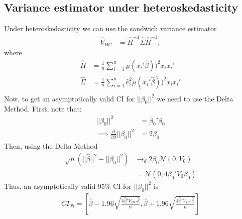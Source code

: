 \documentclass[12pt]{article}
\newcommand{\mtx}[1]{\ensuremath{\bm{\mathit{#1}}}}
\newcommand{\N}{\mathcal{N}}
\begin{document}
\subsection{Variance estimator under heteroskedasticity}
Under heteroskedasticity we can use the sandwich variance estimator
\begin{align*}
\widehat{\mtx{V}}_{HC} &= \hat{H}^{-1}\hat \Sigma \hat{H}^{-1},
\end{align*}
where
\begin{align*}
\hat{H} &= \frac{1}{n} \sum_{i=1}^n \dot{\mu}(\mtx{x}_i'\hat{\mtx{\beta}}))^2\mtx{x}_i\mtx{x}_i'\\
\hat \Sigma &= \frac{1}{n} \sum_{i=1}^n \hat{e}^2_i\dot{\mu}(\mtx{x}_i'\hat{\mtx{\beta}}))^2\mtx{x}_i\mtx{x}_i'\\
\end{align*}
Now, to get an asymptotically valid CI for $|| \mtx{\beta}_0 ||^2$ we need to use the Delta Method. First, note that:
\begin{align*}
|| \mtx{\beta}_0 ||^2 &= \mtx{\beta}_0 ' \mtx{\beta}_0 \\
\implies \frac{\partial}{\partial \beta}|| \mtx{\beta}_0 ||^2 & = 2\mtx{\beta}_0
\end{align*}
Then, using the Delta Method
\begin{align*}
\sqrt{n}(||\hat{\mtx{\beta}}||^2-||\mtx{\beta}_0||^2) &\to_d 2\mtx{\beta}_0 \N(0,\mtx{V}_0)\\ 
&= \N(0,4 \mtx{\beta}_0'\mtx{V}_0 \mtx{\beta}_0)
\end{align*}
Thus, an asymptotically valid 95\% CI for $|| \mtx{\beta}_0 ||^2$ is
\begin{align*}
CI_{95} = \left[\hat{\mtx{\beta}} - 1.96 \sqrt{\frac{4\hat{\mtx{\beta}}'\widehat{\mtx{V}}_{HC}\hat{\mtx{\beta}}}{n}},\hat{\mtx{\beta}} + 1.96 \sqrt{\frac{4\hat{\mtx{\beta}}'\widehat{\mtx{V}}_{HC}\hat{\mtx{\beta}}}{n}}\right]
\end{align*}
\end{document}
